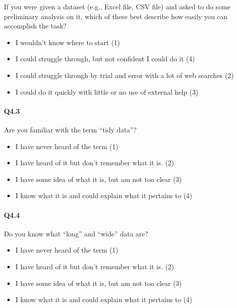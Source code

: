 \documentclass[020-persona\_validation.tex]{subfiles}
\begin{document}
            If you were given a dataset (e.g., Excel file, CSV file)
            and asked to do  some preliminary analysis on it,
            which of these best describe how easily you can accomplish the task?

            \begin{itemize}
                \item I wouldn't know where to start  (1)
                \item I could struggle through, but not confident I could do it  (4)
                \item I could struggle through by trial and error with a lot of web searches  (2)
                \item I could do it quickly with little or no use of external help  (3)
            \end{itemize}

        \paragraph{Q4.3}

            Are you familiar with the term ``tidy data''?

            \begin{itemize}
                \item I have never heard of the term  (1)
                \item I have heard of it but don’t remember what it is.  (2)
                \item I have some idea of what it is, but am not too clear  (3)
                \item I know what it is and could explain what it pertains to  (4)
            \end{itemize}

        \paragraph{Q4.4}

            Do you know what ``long'' and ``wide'' data are?

            \begin{itemize}
                \item I have never heard of the term  (1)
                \item I have heard of it but don’t remember what it is.  (2)
                \item I have some idea of what it is, but am not too clear  (3)
                \item I know what it is and could explain what it pertains to  (4)
            \end{itemize}
\end{document}
